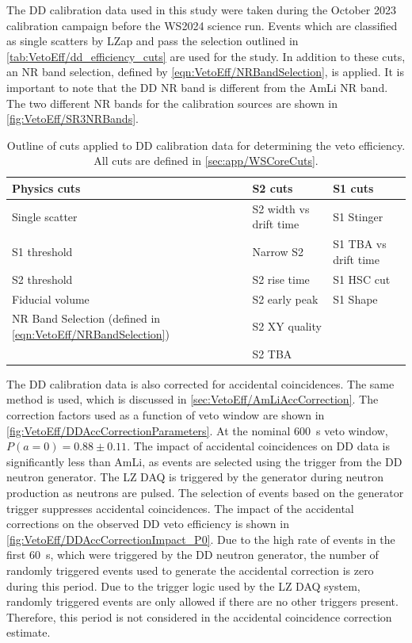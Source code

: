 The DD calibration data used in this study were taken during the October 2023 calibration campaign before the WS2024 science run. Events which are classified as single scatters by LZap and pass the selection outlined in \autoref{tab:VetoEff/dd_efficiency_cuts} are used for the study. In addition to these cuts, an NR band selection, defined by \autoref{eqn:VetoEff/NRBandSelection}, is applied. It is important to note that the DD NR band is different from the AmLi NR band. The two different NR bands for the calibration sources are shown in \autoref{fig:VetoEff/SR3NRBands}.

\begin{table}[!ht]
	\centering
	\caption[Outline of cuts applied to DD calibration data for determining the veto efficiency.]{Outline of cuts applied to DD calibration data for determining the veto efficiency. All cuts are defined in \autoref{sec:app/WSCoreCuts}.}
	\begin{tabular}{lll}
    \hline\hline
	\textbf{Physics cuts}&\textbf{S2 cuts}&\textbf{S1 cuts} \\
	\hline
	Single scatter & S2 width vs drift time & S1 Stinger \\
	S1 threshold & Narrow S2 & S1 TBA vs drift time  \\
	S2 threshold & S2 rise time & S1 HSC cut \\
    Fiducial volume & S2 early peak & S1 Shape \\
	NR Band Selection (defined in \autoref{eqn:VetoEff/NRBandSelection})& S2 XY quality & \\
	& S2 TBA & \\
    \hline\hline
	\end{tabular}
	\label{tab:VetoEff/dd_efficiency_cuts}
\end{table}
The DD calibration data is also corrected for accidental coincidences. The same method is used, which is discussed in \autoref{sec:VetoEff/AmLiAccCorrection}. The correction factors used as a function of veto window are shown in \autoref{fig:VetoEff/DDAccCorrectionParameters}. At the nominal 600~\textmu s veto window, $P(a=0)=0.88\pm0.11$. The impact of accidental coincidences on DD data is significantly less than AmLi, as events are selected using the trigger from the DD neutron generator. The LZ DAQ is triggered by the generator during neutron production as neutrons are pulsed. The selection of events based on the generator trigger suppresses accidental coincidences. The impact of the accidental corrections on the observed DD veto efficiency is shown in \autoref{fig:VetoEff/DDAccCorrectionImpact_P0}. Due to the high rate of events in the first 60~\textmu s, which were triggered by the DD neutron generator, the number of randomly triggered events used to generate the accidental correction is zero during this period. Due to the trigger logic used by the LZ DAQ system, randomly triggered events are only allowed if there are no other triggers present. Therefore, this period is not considered in the accidental coincidence correction estimate.
